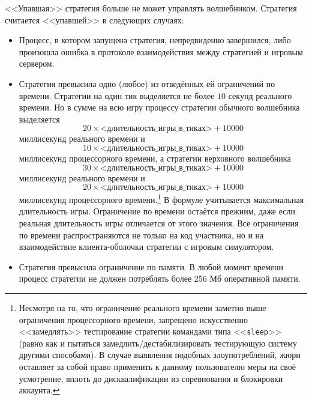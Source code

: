<<Упавшая>> стратегия больше не может управлять волшебником. Стратегия считается <<упавшей>> в следующих случаях:
\begin{itemize}
  \item Процесс, в котором запущена стратегия, непредвиденно завершился, либо произошла ошибка в протоколе взаимодействия между стратегией
        и игровым сервером.
  \item Стратегия превысила одно (любое) из отведённых ей ограничений по времени. Стратегии на один тик выделяется не более $10$ секунд
        реального времени. Но в сумме на всю игру процессу стратегии обычного волшебника выделяется
        \begin{equation}
        20\times\textit{<длительность\_игры\_в\_тиках>}+10000
        \end{equation}
        миллисекунд реального времени и
        \begin{equation}
        10\times\textit{<длительность\_игры\_в\_тиках>}+10000
        \end{equation}
        миллисекунд процессорного времени, а стратегии верховного волшебника
        \begin{equation}
        30\times\textit{<длительность\_игры\_в\_тиках>}+10000
        \end{equation}
        миллисекунд реального времени и
        \begin{equation}
        20\times\textit{<длительность\_игры\_в\_тиках>}+10000
        \end{equation}
        миллисекунд процессорного времени.\footnote[3]{Несмотря на то, что ограничение реального времени заметно выше ограничения
        процессорного времени, запрещено искусственно <<замедлять>> тестирование стратегии командами типа <<\texttt{sleep}>> (равно как и
        пытаться замедлить/дестабилизировать тестирующую систему другими способами). В случае выявления подобных злоупотреблений, жюри
        оставляет за собой право применить к данному пользователю меры на своё усмотрение, вплоть до дисквалификации из соревнования и
        блокировки аккаунта.} В формуле учитывается максимальная длительность игры. Ограничение по времени остаётся прежним, даже если
        реальная длительность игры отличается от этого значения. Все ограничения по времени распространяются не только на код участника, но
        и на взаимодействие клиента-оболочки стратегии с игровым симулятором.
  \item Стратегия превысила ограничение по памяти. В любой момент времени процесс стратегии не должен потреблять более 256 Мб оперативной
        памяти.
\end{itemize}

